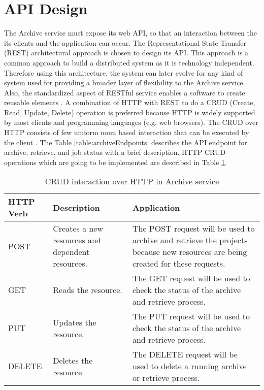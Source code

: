 \section{API Design}
\label{section:APIDesign}
    The Archive service must expose its web API, so that an interaction between the its clients and the application can occur.
    The Representational State Transfer (REST) \cite[Chapter.~5]{REST} architectural approach is chosen to design its API. This approach is a 
    common approach to build a distributed system as it is technology independent. Therefore using this architecture, the system can later 
    evolve for any kind of system used for providing a broader layer of flexibility to the Archive service. 
    Also, the standardized aspect of RESTful service enables a software to create reusable elements \cite{RESTThesis}. A combination of HTTP with REST 
    to do a CRUD (Create, Read, Update, Delete) operation is preferred because HTTP is widely supported by most clients and programming languages (e.g. web browsers).
    The CRUD over HTTP consists of few uniform noun based interaction that can be executed by the client \cite[p.~13]{RESTThesis}. The
    Table \ref{table:archiveEndpoints} describes the API endpoint for archive, retrieve, and job status with a brief description.
    HTTP CRUD operations which are going to be implemented are described in Table \ref{table:curdHttp}. 

    \begin{table}[H]
        \centering
        \begin{tabular}{|p{2cm}|p{4cm}|p{7.5cm}|}
            \hline
                \textbf{HTTP Verb}  & \textbf{Description} & \textbf{Application}\\
            \hline
                POST & 
                Creates a new resources and dependent resources.
                & The POST request will be used to archive and retrieve the projects because new resources are being created for these requests.\\
            \hline
                GET & Reads the resource. & The GET request will be used to check the status of the archive and retrieve process. \\
            \hline
            PUT & Updates the resource. & The PUT request will be used to check the status of the archive and retrieve process. \\
            \hline
                DELETE & Deletes the resource. & The DELETE request will be used to delete a running archive or retrieve process. \\                
            \hline
        \end{tabular}
        \caption{CRUD interaction over HTTP in Archive service}
        \label{table:curdHttp}     
    \end{table}   
    
